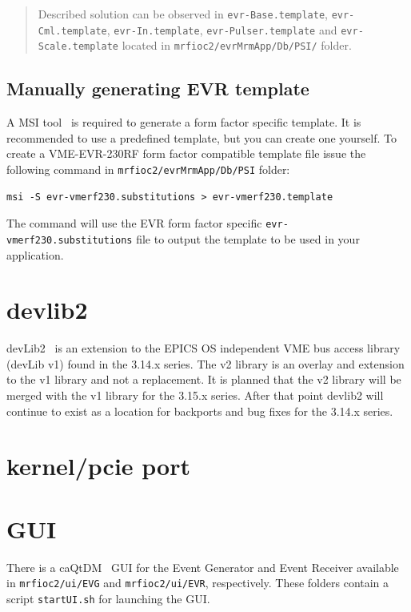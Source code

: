 \documentclass[12pt,a4paper]{article}
\let\stdsection\section
\renewcommand\section{\newpage\stdsection}
\begin{document}
\begin{quote}
Described solution can be observed in \texttt{evr-Base.template},
\texttt{evr-Cml.template}, \texttt{evr-In.template},
\texttt{evr-Pulser.template} and \texttt{evr-Scale.template} located in
\texttt{mrfioc2/evrMrmApp/Db/PSI/} folder.
\end{quote}

\subsection{Manually generating EVR template}\label{manually-generating-evr-template}
A MSI tool~\cite{msi} is required to generate a form factor specific template. It
is recommended to use a predefined template, but you can create one
yourself. To create a VME-EVR-230RF form factor compatible template file issue the following command in \texttt{mrfioc2/evrMrmApp/Db/PSI} folder:

\begin{verbatim}
msi -S evr-vmerf230.substitutions > evr-vmerf230.template 
\end{verbatim}

The command will use the EVR form factor specific \texttt{evr-vmerf230.substitutions}
file to output the template to be used in your application.



\section{devlib2}\label{sec:devlib2}
devLib2~\cite{devlib2} is an extension to the EPICS OS independent VME bus access library (devLib v1) found in the 3.14.x series. The v2 library is an overlay and extension to the v1 library and not a replacement. It is planned that the v2 library will be merged with the v1 library for the 3.15.x series. After that point devlib2 will continue to exist as a location for backports and bug fixes for the 3.14.x series.

\section{kernel/pcie port}\label{sec:kernel/pcie port}


\section{GUI}\label{sec:GUI}
There is a caQtDM~\cite{caqtdm} GUI for the Event Generator and Event Receiver available in \texttt{mrfioc2/ui/EVG} and \texttt{mrfioc2/ui/EVR}, respectively. These folders contain a script \texttt{startUI.sh} for launching the GUI.
\end{document}
